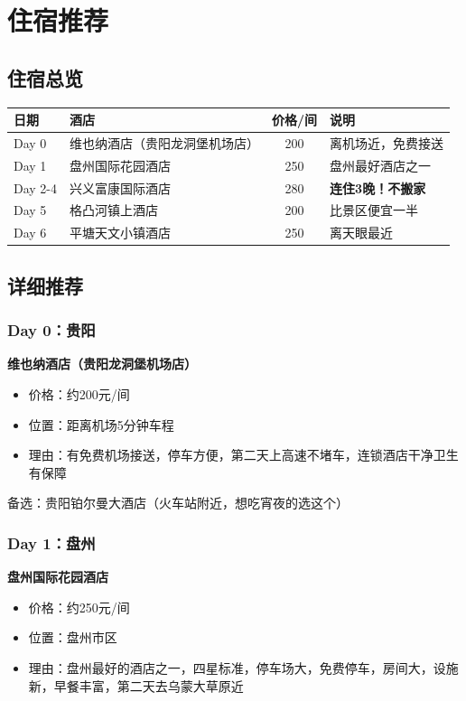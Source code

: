 \documentclass[12pt,a4paper,UTF8]{ctexart}
\begin{document}
\newpage

\section{住宿推荐}

\subsection{住宿总览}
\begin{table}[h]
\centering
\begin{tabular}{llcl}
\toprule
日期 & 酒店 & 价格/间 & 说明 \\
\midrule
Day 0 & 维也纳酒店（贵阳龙洞堡机场店） & 200 & 离机场近，免费接送 \\
Day 1 & 盘州国际花园酒店 & 250 & 盘州最好酒店之一 \\
Day 2-4 & 兴义富康国际酒店 & 280 & \textbf{连住3晚！不搬家} \\
Day 5 & 格凸河镇上酒店 & 200 & 比景区便宜一半 \\
Day 6 & 平塘天文小镇酒店 & 250 & 离天眼最近 \\
\bottomrule
\end{tabular}
\end{table}

\subsection{详细推荐}

\subsubsection{Day 0：贵阳}
\textbf{维也纳酒店（贵阳龙洞堡机场店）}
\begin{itemize}
\item 价格：约200元/间
\item 位置：距离机场5分钟车程
\item 理由：有免费机场接送，停车方便，第二天上高速不堵车，连锁酒店干净卫生有保障
\end{itemize}

备选：贵阳铂尔曼大酒店（火车站附近，想吃宵夜的选这个）

\subsubsection{Day 1：盘州}
\textbf{盘州国际花园酒店}
\begin{itemize}
\item 价格：约250元/间
\item 位置：盘州市区
\item 理由：盘州最好的酒店之一，四星标准，停车场大，免费停车，房间大，设施新，早餐丰富，第二天去乌蒙大草原近
\end{itemize}
\end{document}
